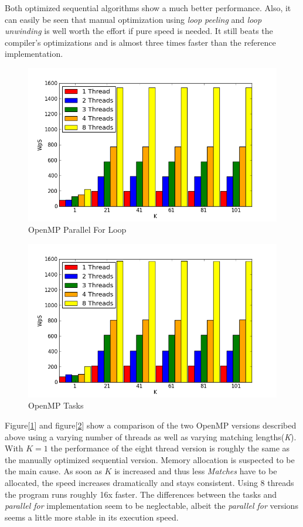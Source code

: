 \documentclass[a4paper,twoside,11pt]{article}
\begin{document}
Both optimized sequential algorithms show a much better performance. Also, it can easily be seen that manual optimization using \textit{loop peeling} and \textit{loop unwinding} is well worth the effort if pure speed is needed. It still beats the compiler's optimizations and is almost three times faster than the reference implementation.

\begin{figure}[hbtp]
\caption{OpenMP Parallel For Loop}
\centering
\label{fig:omp_parallel}
\includegraphics[scale=0.8]{omp_for.png}
\end{figure}

\begin{figure}[hbtp]
\caption{OpenMP Tasks}
\centering
\label{fig:omp_tasks}
\includegraphics[scale=0.8]{omp_tasks.png}
\end{figure}

Figure[\ref{fig:omp_parallel}] and figure[\ref{fig:omp_tasks}] show a comparison of the two OpenMP versions described above using a  varying number of threads as well as varying matching lengths(\textit{K}). With $K=1$ the performance of the eight thread version is roughly the same as the manually optimized sequential version. Memory allocation is suspected to be the main cause. As soon as $K$ is increased and thus less \textit{Matches} have to be allocated, the speed increases dramatically and stays consistent.
Using 8 threads the program runs roughly 16x faster.
The differences between the tasks and \textit{parallel for} implementation seem to be neglectable, albeit the \textit{parallel for} versions seems a little more stable in its execution speed.
\end{document}
